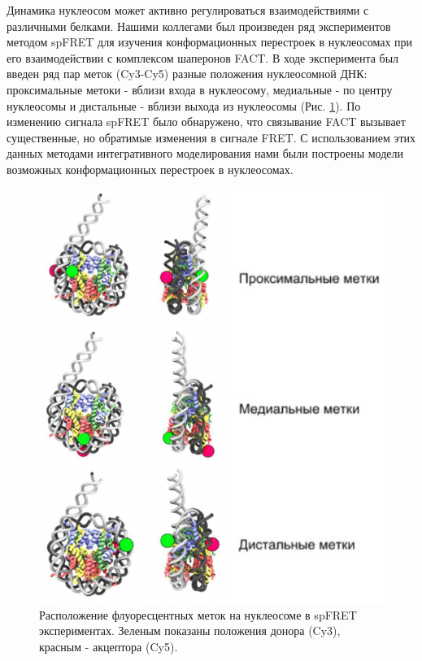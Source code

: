     
  
  Динамика нуклеосом может активно регулироваться взаимодействиями с различными белками. Нашими коллегами был произведен ряд экспериментов методом spFRET для изучения конформационных перестроек в нуклеосомах при его взаимодействии с комплексом шаперонов FACT. В ходе эксперимента был введен ряд пар меток (Cy3-Cy5) разные положения нуклеосомной ДНК: проксимальные метоки - вблизи входа в нуклеосому, медиальные - по центру нуклеосомы и дистальные - вблизи выхода из нуклеосомы (Рис. \ref{fig:p6_3_f22}). По изменению сигнала spFRET было обнаружено, что связывание FACT вызывает существенные, но обратимые изменения в сигнале FRET. С использованием этих данных методами интегративного моделирования нами были построены модели возможных конформационных перестроек в нуклеосомах.
    
\begin{figure} [H]
    \centering
    \includegraphics[width=\textwidth]{images/p6/p6_3/p6_3_f22.pdf}
    \caption[Расположение флуоресцентных меток на нуклеосоме в spFRET экспериментах]{Расположение флуоресцентных меток на нуклеосоме в spFRET экспериментах. Зеленым показаны положения донора (Cy3), красным - акцептора (Cy5).}
    \label{fig:p6_3_f22}
\end{figure}
    
